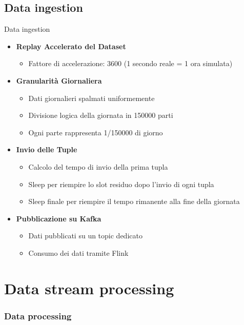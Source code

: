 \documentclass[13pt,aspectratio=169,t,xcolor=table]{beamer}
\begin{document}
\subsection{Data ingestion}
\begin{frame}{Data ingestion}
    \begin{itemize}
        \item \textbf{Replay Accelerato del Dataset}
            \begin{itemize}
                \item Fattore di accelerazione: 3600 (1 secondo reale = 1 ora simulata)
            \end{itemize}
        \item \textbf{Granularità Giornaliera}
            \begin{itemize}
                \item Dati giornalieri spalmati uniformemente
                \item Divisione logica della giornata in 150000 parti
                \item Ogni parte rappresenta 1/150000 di giorno
            \end{itemize}
        \item \textbf{Invio delle Tuple}
            \begin{itemize}
                \item Calcolo del tempo di invio della prima tupla
                \item Sleep per riempire lo slot residuo dopo l'invio di ogni tupla
                \item Sleep finale per riempire il tempo rimanente alla fine della giornata
            \end{itemize}
        \item \textbf{Pubblicazione su Kafka}
            \begin{itemize}
                \item Dati pubblicati su un topic dedicato
                \item Consumo dei dati tramite Flink
            \end{itemize}
    \end{itemize}
\end{frame}

\section{Data stream processing}

\begin{frame}{}
    \frametitle{Data processing}
\end{frame}
\end{document}
